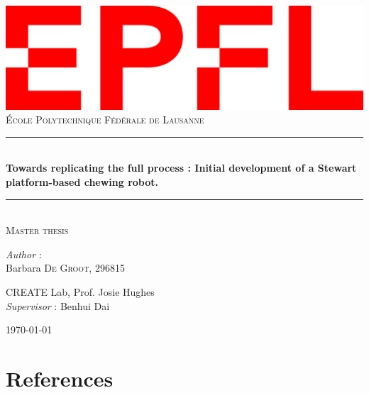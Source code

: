\documentclass[11pt,a4paper]{article}
\begin{document}
    \begin{titlepage}
    \newcommand{\HRule}{\rule{\linewidth}{0.2mm}}
    \center
    \includegraphics[scale=0.25]{figures/logo.png}\\[0.4cm]

    \textsc{\LARGE École Polytechnique Fédérale de Lausanne}\\[1.5cm]
    \vfill
    
    \HRule \\[0.4cm]
    {\huge \bfseries Towards replicating the full process : Initial development of a Stewart platform-based chewing robot.}\\
    \HRule \\ [0.5cm]
    
    \textsc{\Large Master thesis}
    \vfill 
   
    \centering
    \bigskip
    \textit{Author} : \\[0.2cm]

    Barbara \textsc{De Groot, 296815}\\

    \bigskip
    \bigskip

    CREATE Lab, Prof. Josie Hughes\\
    \textit{Supervisor} : Benhui Dai\\[0.2cm]

    \bigskip
    \bigskip
    
    {\large \today}\\[2cm]
    \end{titlepage}

\newpage
\tableofcontents

\newpage
%






\newpage
\section{References}
\printbibliography[heading=none]

% 
% 
\end{document}
